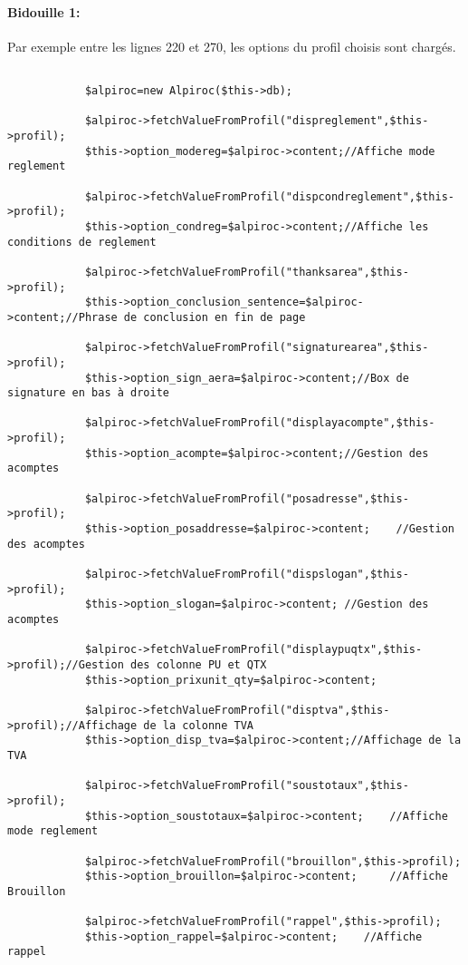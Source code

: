 \documentclass[a4paper,11pt]{article}
\begin{document}
\paragraph{Bidouille 1:\\}

Par exemple entre les lignes 220 et 270, les options du profil choisis sont chargés. 
\begin{verbatim}
 
			$alpiroc=new Alpiroc($this->db);

			$alpiroc->fetchValueFromProfil("dispreglement",$this->profil);
			$this->option_modereg=$alpiroc->content;//Affiche mode reglement
		
			$alpiroc->fetchValueFromProfil("dispcondreglement",$this->profil);
			$this->option_condreg=$alpiroc->content;//Affiche les conditions de reglement
		
			$alpiroc->fetchValueFromProfil("thanksarea",$this->profil);
			$this->option_conclusion_sentence=$alpiroc->content;//Phrase de conclusion en fin de page
		
			$alpiroc->fetchValueFromProfil("signaturearea",$this->profil);
			$this->option_sign_aera=$alpiroc->content;//Box de signature en bas à droite
		
			$alpiroc->fetchValueFromProfil("displayacompte",$this->profil);
			$this->option_acompte=$alpiroc->content;//Gestion des acomptes
			
			$alpiroc->fetchValueFromProfil("posadresse",$this->profil);
			$this->option_posaddresse=$alpiroc->content;	//Gestion des acomptes
		
			$alpiroc->fetchValueFromProfil("dispslogan",$this->profil);
			$this->option_slogan=$alpiroc->content;	//Gestion des acomptes
		
			$alpiroc->fetchValueFromProfil("displaypuqtx",$this->profil);//Gestion des colonne PU et QTX
			$this->option_prixunit_qty=$alpiroc->content;
			
			$alpiroc->fetchValueFromProfil("disptva",$this->profil);//Affichage de la colonne TVA
			$this->option_disp_tva=$alpiroc->content;//Affichage de la TVA
		
			$alpiroc->fetchValueFromProfil("soustotaux",$this->profil);
			$this->option_soustotaux=$alpiroc->content;	   //Affiche mode reglement
		
			$alpiroc->fetchValueFromProfil("brouillon",$this->profil);
			$this->option_brouillon=$alpiroc->content;	   //Affiche Brouillon
			
			$alpiroc->fetchValueFromProfil("rappel",$this->profil);
			$this->option_rappel=$alpiroc->content;	   //Affiche rappel
			

\end{verbatim}
\end{document}
